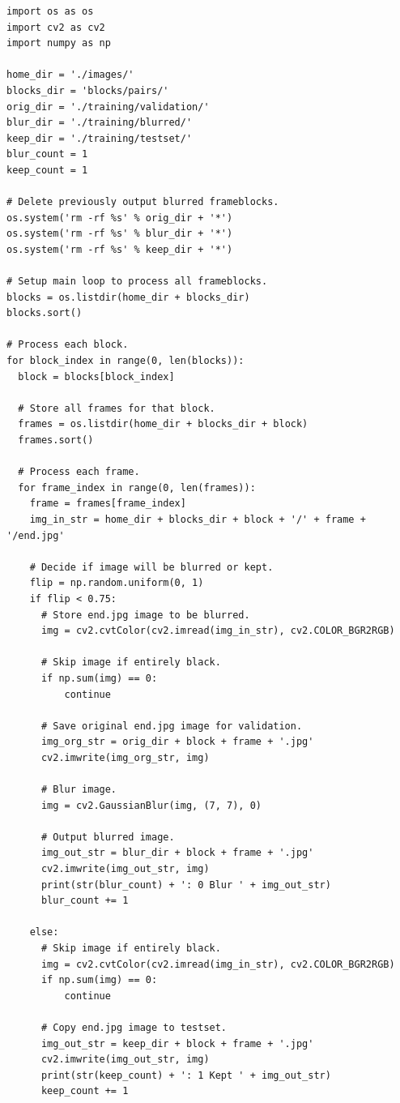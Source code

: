 \documentclass[conference]{IEEEtran}
\begin{document}
\begin{verbatim}
import os as os
import cv2 as cv2
import numpy as np

home_dir = './images/'
blocks_dir = 'blocks/pairs/'
orig_dir = './training/validation/'
blur_dir = './training/blurred/'
keep_dir = './training/testset/'
blur_count = 1
keep_count = 1

# Delete previously output blurred frameblocks.
os.system('rm -rf %s' % orig_dir + '*')
os.system('rm -rf %s' % blur_dir + '*')
os.system('rm -rf %s' % keep_dir + '*')

# Setup main loop to process all frameblocks.
blocks = os.listdir(home_dir + blocks_dir)
blocks.sort()

# Process each block.
for block_index in range(0, len(blocks)):
  block = blocks[block_index]

  # Store all frames for that block.
  frames = os.listdir(home_dir + blocks_dir + block)
  frames.sort()

  # Process each frame.
  for frame_index in range(0, len(frames)):
    frame = frames[frame_index]
    img_in_str = home_dir + blocks_dir + block + '/' + frame + '/end.jpg'

    # Decide if image will be blurred or kept.
    flip = np.random.uniform(0, 1)
    if flip < 0.75:
      # Store end.jpg image to be blurred.
      img = cv2.cvtColor(cv2.imread(img_in_str), cv2.COLOR_BGR2RGB)

      # Skip image if entirely black.
      if np.sum(img) == 0:
          continue

      # Save original end.jpg image for validation.
      img_org_str = orig_dir + block + frame + '.jpg'
      cv2.imwrite(img_org_str, img)

      # Blur image.
      img = cv2.GaussianBlur(img, (7, 7), 0)
      
      # Output blurred image.
      img_out_str = blur_dir + block + frame + '.jpg'
      cv2.imwrite(img_out_str, img)
      print(str(blur_count) + ': 0 Blur ' + img_out_str)
      blur_count += 1

    else:
      # Skip image if entirely black.
      img = cv2.cvtColor(cv2.imread(img_in_str), cv2.COLOR_BGR2RGB)
      if np.sum(img) == 0:
          continue

      # Copy end.jpg image to testset.
      img_out_str = keep_dir + block + frame + '.jpg'
      cv2.imwrite(img_out_str, img)
      print(str(keep_count) + ': 1 Kept ' + img_out_str)
      keep_count += 1
\end{verbatim}
\end{document}
